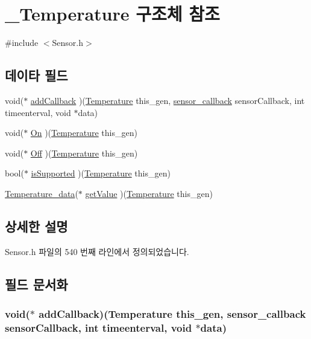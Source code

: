 \hypertarget{struct___temperature}{\section{\-\_\-\-Temperature 구조체 참조}
\label{struct___temperature}
}


{\ttfamily \#include $<$Sensor.\-h$>$}

\subsection*{데이타 필드}
\begin{DoxyCompactItemize}
\item 
void($\ast$ \hyperlink{struct___temperature_aa97759f4d5f8befb3dec5c8023640f63}{add\-Callback} )(\hyperlink{_sensor_8h_a9d4d4bb9117d2f01bf1bcde4e7108c6e}{Temperature} this\-\_\-gen, \hyperlink{_sensor_8h_ad8114207845fc5e0aa30832f0c718cd6}{sensor\-\_\-callback} sensor\-Callback, int timeenterval, void $\ast$data)
\item 
void($\ast$ \hyperlink{struct___temperature_af7b298c4d127ff352cd1771cb90bd108}{On} )(\hyperlink{_sensor_8h_a9d4d4bb9117d2f01bf1bcde4e7108c6e}{Temperature} this\-\_\-gen)
\item 
void($\ast$ \hyperlink{struct___temperature_a8c4b6d47c9f055fc483d5a46e565c756}{Off} )(\hyperlink{_sensor_8h_a9d4d4bb9117d2f01bf1bcde4e7108c6e}{Temperature} this\-\_\-gen)
\item 
bool($\ast$ \hyperlink{struct___temperature_a066c1b02fe31ddfb64ef783d1fefd1a2}{is\-Supported} )(\hyperlink{_sensor_8h_a9d4d4bb9117d2f01bf1bcde4e7108c6e}{Temperature} this\-\_\-gen)
\item 
\hyperlink{_sensor_8h_aa61939fab26530f076ca04c0a058a287}{Temperature\-\_\-data}($\ast$ \hyperlink{struct___temperature_a660cf710a2d1e34072bd9a1ab95d368b}{get\-Value} )(\hyperlink{_sensor_8h_a9d4d4bb9117d2f01bf1bcde4e7108c6e}{Temperature} this\-\_\-gen)
\end{DoxyCompactItemize}


\subsection{상세한 설명}


Sensor.\-h 파일의 540 번째 라인에서 정의되었습니다.



\subsection{필드 문서화}
\hypertarget{struct___temperature_aa97759f4d5f8befb3dec5c8023640f63}{
\subsubsection[{add\-Callback}]{\setlength{\rightskip}{0pt plus 5cm}void($\ast$  add\-Callback)({\bf Temperature} this\-\_\-gen, {\bf sensor\-\_\-callback} sensor\-Callback, int timeenterval, void $\ast$data)}}\label{struct___temperature_aa97759f4d5f8befb3dec5c8023640f63}


